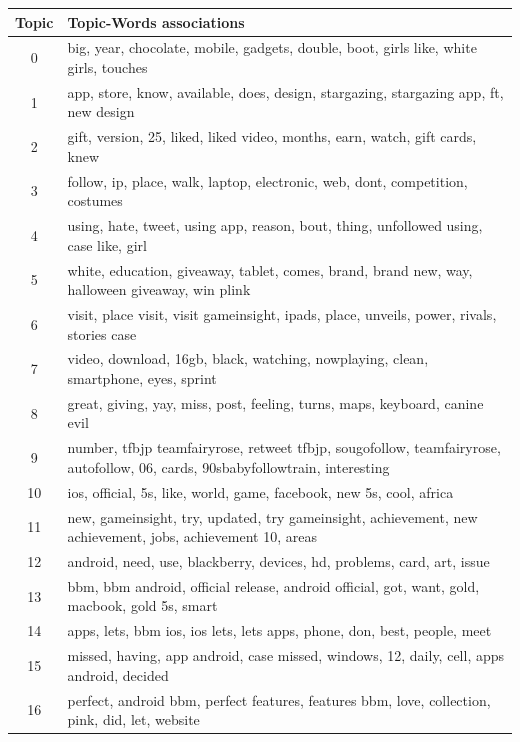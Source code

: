 \begin{longtable}{c p{16cm}} \toprule
  Topic & Topic-Words associations \\ \midrule
   0    & big, year, chocolate, mobile, gadgets, double, boot, girls like, white girls, touches \\ \midrule
   1    & app, store, know, available, does, design, stargazing, stargazing app, ft, new design \\ \midrule
   2    & gift, version, 25, liked, liked video, months, earn, watch, gift cards, knew \\ \midrule
   3    & follow, ip, place, walk, laptop, electronic, web, dont, competition, costumes \\ \midrule
   4    & using, hate, tweet, using app, reason, bout, thing, unfollowed using, case like, girl \\ \midrule
   5    & white, education, giveaway, tablet, comes, brand, brand new, way, halloween giveaway, win plink \\ \midrule
   6    & visit, place visit, visit gameinsight, ipads, place, unveils, power, rivals, stories case \\ \midrule
   7    & video, download, 16gb, black, watching, nowplaying, clean, smartphone, eyes, sprint \\ \midrule
   8    & great, giving, yay, miss, post, feeling, turns, maps, keyboard, canine evil \\ \midrule
   9    & number, tfbjp teamfairyrose, retweet tfbjp, sougofollow, teamfairyrose, autofollow, 06, cards, 90sbabyfollowtrain, interesting \\ \midrule
   10   & ios, official, 5s, like, world, game, facebook, new 5s, cool, africa \\ \midrule
   11   & new, gameinsight, try, updated, try gameinsight, achievement, new achievement, jobs, achievement 10, areas \\ \midrule
   12   & android, need, use, blackberry, devices, hd, problems, card, art, issue \\ \midrule
   13   & bbm, bbm android, official release, android official, got, want, gold, macbook, gold 5s, smart \\ \midrule
   14   & apps, lets, bbm ios, ios lets, lets apps, phone, don, best, people, meet \\ \midrule
   15   & missed, having, app android, case missed, windows, 12, daily, cell, apps android, decided \\ \midrule
   16   & perfect, android bbm, perfect features, features bbm, love, collection, pink, did, let, website \\ \midrule

\end{longtable}
